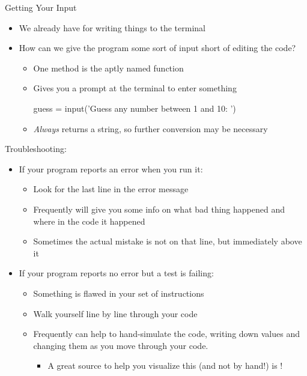 \documentclass[pdf, aspectratio=169, 12pt]{beamer}
\begin{document}
\begin{frame}[fragile]{Getting Your Input}
	\begin{itemize}
		\item We already have  for writing things to the terminal
		\item How can we give the program some sort of input short of editing the code?
			\begin{itemize}
				\item One method is the aptly named  function
				\item Gives you a \alert{prompt} at the terminal to enter something
					\begin{pythoncode}
						guess = input('Guess any number between 1 and 10: ')
					\end{pythoncode}
				\item \emph{Always} returns a \alert{string}, so further conversion may be necessary
			\end{itemize}
	\end{itemize}
\end{frame}

\begin{frame}{Troubleshooting:}
	\begin{itemize}
		\item If your program reports an error when you run it:
			\begin{itemize}
				\item Look for the last line in the error message
				\item Frequently will give you some info on what bad thing happened and where in the code it happened
				\item Sometimes the actual mistake is not on that line, but immediately above it
			\end{itemize}
		\item If your program reports no error but a test is failing:
			\begin{itemize}
				\item Something is flawed in your set of instructions
				\item Walk yourself line by line through your code
				\item Frequently can help to \alert{hand-simulate} the code, writing down values and changing them as you move through your code.
					\begin{itemize}
						\item A great source to help you visualize this (and not by hand!) is !
					\end{itemize}
			\end{itemize}
	\end{itemize}
\end{frame}
\end{document}
